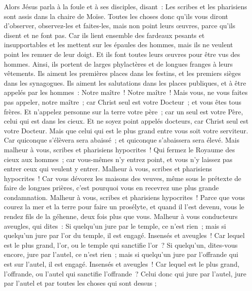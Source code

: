 \begin{multicols}{2}
\VerseOne{}Alors Jésus parla à la foule et à ses disciples,
disant~: Les scribes et les pharisiens sont assis dans la chaire de Moïse.
Toutes les choses donc qu'ils vous diront d'observer, observez-les et faites-les, mais non point leurs œuvres, parce qu'ils disent et ne font pas.
Car ils lient ensemble des fardeaux pesants et insupportables et les mettent sur les épaules des hommes, mais ils ne veulent point les remuer de leur doigt.
Et ils font toutes leurs œuvres pour être vus des hommes. Ainsi, ils portent de larges phylactères et de longues franges à leurs vêtements.
Ils aiment les premières places dans les festins, et les premiers sièges dans les synagogues.
Ils aiment les salutations dans les places publiques, et à être appelés par les hommes~: Notre maître~! Notre maître~!
Mais vous, ne vous faites pas appeler, notre maître~; car Christ seul est votre Docteur~; et vous êtes tous frères.
Et n'appelez personne sur la terre votre père~; car un seul est votre Père, celui qui est dans les cieux.
Et ne soyez point appelés docteurs, car Christ seul est votre Docteur.
Mais que celui qui est le plus grand entre vous soit votre serviteur.
Car quiconque s'élèvera sera abaissé~; et quiconque s'abaissera sera élevé.
Mais malheur à vous, scribes et pharisiens hypocrites~! Qui fermez le Royaume des cieux aux hommes~; car vous-mêmes n'y entrez point, et vous n'y laissez pas entrer ceux qui veulent y entrer.
Malheur à vous, scribes et pharisiens hypocrites~! Car vous dévorez les maisons des veuves, même sous le prétexte de faire de longues prières, c'est pourquoi vous en recevrez une plus grande condamnation.
Malheur à vous, scribes et pharisiens hypocrites~! Parce que vous courez la mer et la terre pour faire un prosélyte, et quand il l'est devenu, vous le rendez fils de la géhenne, deux fois plus que vous.
Malheur à vous conducteurs aveugles, qui dites~: Si quelqu'un jure par le temple, ce n'est rien~; mais si quelqu'un jure par l'or du temple, il est engagé.
Insensés et aveugles~! Car lequel est le plus grand, l'or, ou le temple qui sanctifie l'or~?
Si quelqu'un, dites-vous encore, jure par l'autel, ce n'est rien~; mais si quelqu'un jure par l'offrande qui est sur l'autel, il est engagé.
Insensés et aveugles~! Car lequel est le plus grand, l'offrande, ou l'autel qui sanctifie l'offrande~?
Celui donc qui jure par l'autel, jure par l'autel et par toutes les choses qui sont dessus ;

\end{multicols}
